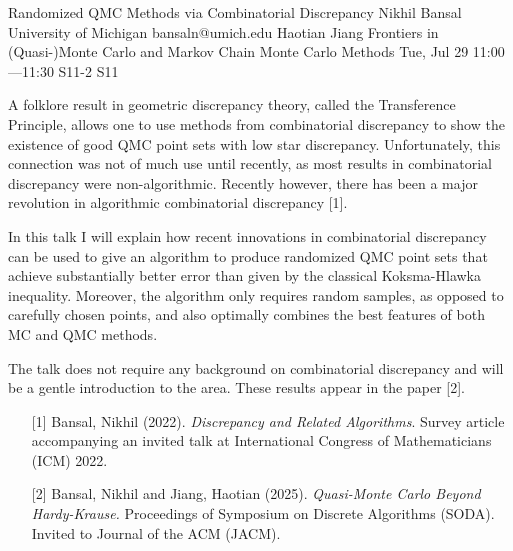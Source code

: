 \begin{talk}
  {Randomized QMC Methods via Combinatorial Discrepancy}%
  {Nikhil Bansal}%
  {University of Michigan}%
  {bansaln@umich.edu}%
  {Haotian Jiang}%
  {Frontiers in (Quasi-)Monte Carlo and Markov Chain Monte Carlo Methods}%
  {Tue, Jul 29 11:00---11:30}%
  {S11-2}%
  {S11}%
    

A folklore result in geometric discrepancy theory, called the Transference Principle, allows one to use methods from combinatorial discrepancy to show the existence of good QMC point sets with low star discrepancy.
Unfortunately, this connection was not of much use until recently, as most results in combinatorial discrepancy were non-algorithmic. Recently however, there has been a major revolution in algorithmic combinatorial discrepancy [1]. 

In this talk I will explain how recent innovations in combinatorial discrepancy can be used to give an algorithm to produce randomized QMC point sets that  achieve substantially better error than given by the classical Koksma-Hlawka inequality. Moreover, the algorithm only requires random samples, as opposed to carefully chosen points, and also optimally combines the best features of both MC and QMC methods.  

 

The talk does not require any background on combinatorial discrepancy and will be a gentle introduction to the area. 
These results appear in the paper [2].

\medskip

\begin{enumerate}
 \item[{[1]}] Bansal, Nikhil (2022). {\it Discrepancy and Related Algorithms}. Survey article accompanying an invited talk at 
     International Congress of Mathematicians (ICM) 2022.
     
 \item[{[2]}]  Bansal, Nikhil and Jiang, Haotian (2025). {\em Quasi-Monte Carlo Beyond Hardy-Krause.} Proceedings of Symposium on Discrete Algorithms (SODA). Invited to Journal of the ACM (JACM). 
\end{enumerate}
\end{talk}

